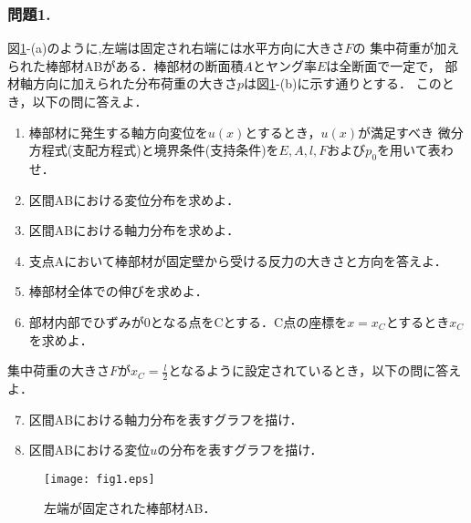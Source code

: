 \documentclass[10pt,a4j]{jarticle}
\begin{document}
\subsubsection*{問題1.}
図\ref{fig:fig1}-(a)のように,左端は固定され右端には水平方向に大きさ$F$の
集中荷重が加えられた棒部材ABがある．棒部材の断面積$A$とヤング率$E$は全断面で一定で，
部材軸方向に加えられた分布荷重の大きさ$p$は図\ref{fig:fig1}-(b)に示す通りとする．
このとき，以下の問に答えよ．
\begin{enumerate}
\item
	棒部材に発生する軸方向変位を$u(x)$とするとき，$u(x)$が満足すべき
	微分方程式(支配方程式)と境界条件(支持条件)を$E, A, l, F$および$p_0$を用いて表わせ．
\item
	区間ABにおける変位分布を求めよ．
\item	
	区間ABにおける軸力分布を求めよ．
\item	
	支点Aにおいて棒部材が固定壁から受ける反力の大きさと方向を答えよ．
\item
	棒部材全体での伸びを求めよ．
\item
	部材内部でひずみが0となる点をCとする．C点の座標を$x=x_C$とするとき$x_C$を求めよ．
\end{enumerate}
集中荷重の大きさ$F$が$x_C=\frac{l}{2}$となるように設定されているとき，以下の問に答えよ．
\begin{enumerate}
\setcounter{enumi}{6}
\item
	区間ABにおける軸力分布を表すグラフを描け．
\item
	区間ABにおける変位$u$の分布を表すグラフを描け．
\end{enumerate}
\begin{figure}[h]
	\begin{center}
	\texttt{[image: fig1.eps]} 
	\end{center}
	\caption{左端が固定された棒部材AB．}
	\label{fig:fig1}
\end{figure}
\newpage
\end{document}
